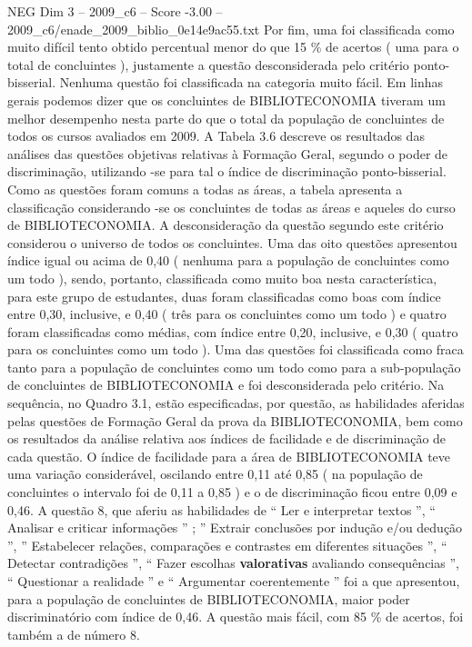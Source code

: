 \begin{textsample}{NEG Dim 3 – 2009\_c6 – Score -3.00 – 2009\_c6/enade\_2009\_biblio\_0e14e9ac55.txt}
Por fim, uma foi classificada como muito difícil tento obtido percentual menor do que 15 \% de acertos ( uma para o total de concluintes ), justamente a questão desconsiderada pelo critério ponto-bisserial.
Nenhuma questão foi classificada na categoria muito fácil.
Em linhas gerais podemos dizer que os concluintes de BIBLIOTECONOMIA tiveram um melhor desempenho nesta parte do que o total da população de concluintes de todos os cursos avaliados em 2009.
A Tabela 3.6 descreve os resultados das análises das questões objetivas relativas à Formação Geral, segundo o poder de discriminação, utilizando -se para tal o índice de discriminação ponto-bisserial.
Como as questões foram comuns a todas as áreas, a tabela apresenta a classificação considerando -se os concluintes de todas as áreas e aqueles do curso de BIBLIOTECONOMIA.
A desconsideração da questão segundo este critério considerou o universo de todos os concluintes.
Uma das oito questões apresentou índice igual ou acima de 0,40 ( nenhuma para a população de concluintes como um todo ), sendo, portanto, classificada como muito boa nesta característica, para este grupo de estudantes, duas foram classificadas como boas com índice entre 0,30, inclusive, e 0,40 ( três para os concluintes como um todo ) e quatro foram classificadas como médias, com índice entre 0,20, inclusive, e 0,30 ( quatro para os concluintes como um todo ).
Uma das questões foi classificada como fraca tanto para a população de concluintes como um todo como para a sub-população de concluintes de BIBLIOTECONOMIA e foi desconsiderada pelo critério.
Na sequência, no Quadro 3.1, estão especificadas, por questão, as habilidades aferidas pelas questões de Formação Geral da prova da BIBLIOTECONOMIA, bem como os resultados da análise relativa aos índices de facilidade e de discriminação de cada questão.
O índice de facilidade para a área de BIBLIOTECONOMIA teve uma variação considerável, oscilando entre 0,11 até 0,85 ( na população de concluintes o intervalo foi de 0,11 a 0,85 ) e o de discriminação ficou entre 0,09 e 0,46.
A questão 8, que aferiu as habilidades de “ Ler e interpretar textos ”, “ Analisar e criticar informações ” ; ” Extrair conclusões por indução e/ou dedução ”, ” Estabelecer relações, comparações e contrastes em diferentes situações ”, “ Detectar contradições ”, “ Fazer escolhas \textbf{valorativas} avaliando consequências ”, “ Questionar a realidade ” e “ Argumentar coerentemente ” foi a que apresentou, para a população de concluintes de BIBLIOTECONOMIA, maior poder discriminatório com índice de 0,46.
A questão mais fácil, com 85 \% de acertos, foi também a de número 8.

\end{textsample}
